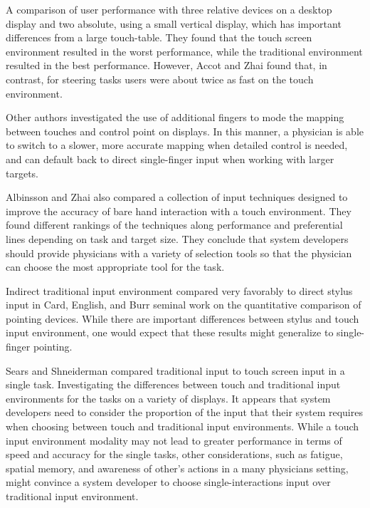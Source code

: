 \documentclass{sigchi}
\begin{document}
A comparison of user performance \cite{meyer1994device} with three relative devices on a desktop display and two absolute, using a small vertical display, which has important differences from a large touch-table. They found that the touch screen environment resulted in the worst performance, while the traditional environment resulted in the best performance. However, Accot and Zhai \cite{accot1997beyond} found that, in contrast, for steering tasks users were about twice as fast on the touch environment.

Other authors \cite{benko2006precise, esenther2006fluid} investigated the use of additional fingers to mode the mapping between touches and control point on displays. In this manner, a physician is able to switch to a slower, more accurate mapping when detailed control is needed, and can default back to direct single-finger input when working with larger targets.

Albinsson and Zhai \cite{albinsson2003high} also compared a collection of input techniques designed to improve the accuracy of bare hand interaction with a touch environment. They found different rankings of the techniques along performance and preferential lines depending on task and target size. They conclude that system developers should provide physicians with a variety of selection tools so that the physician can choose the most appropriate tool for the task.

Indirect traditional input environment compared very favorably to direct stylus input in Card, English, and Burr \cite{card1978evaluation} seminal work on the quantitative comparison of pointing devices. While there are important differences between stylus and touch input environment, one would expect that these results might generalize to single-finger pointing.

Sears and Shneiderman \cite{sears1991high} compared traditional input to touch screen input in a single task. Investigating the differences between touch and traditional input environments \cite{forlines2007direct} for the tasks on a variety of displays. It appears that system developers need to consider the proportion of the input that their system requires when choosing between touch and traditional input environments. While a touch input environment modality may not lead to greater performance in terms of speed and accuracy for the single tasks, other considerations, such as fatigue, spatial memory, and awareness of other’s actions in a many physicians setting, might convince a system developer to choose single-interactions input over traditional input environment.
\end{document}
